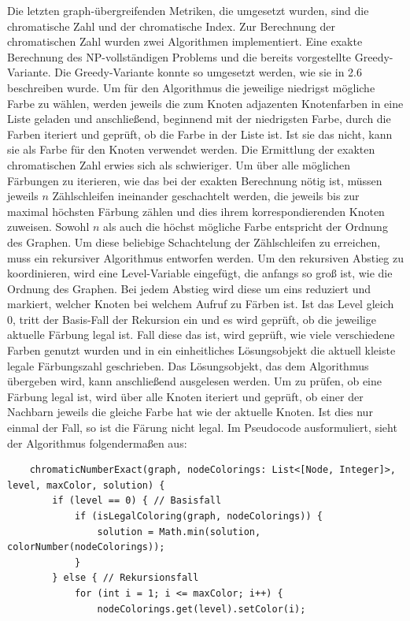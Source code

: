 \documentclass[a4paper,12pt,ngerman,chapterprefix=false,listof=totoc,bibliography=totoc]{scrreprt}
\begin{document}
{{{Die letzten graph-übergreifenden Metriken, die umgesetzt wurden, sind die chromatische Zahl und der chromatische Index. Zur Berechnung der chromatischen Zahl wurden zwei Algorithmen implementiert. Eine exakte Berechnung des NP-vollständigen Problems und die bereits vorgestellte Greedy-Variante. Die Greedy-Variante konnte so umgesetzt werden, wie sie in 2.6 beschreiben wurde. Um für den Algorithmus die jeweilige niedrigst mögliche Farbe zu wählen, werden jeweils die zum Knoten adjazenten Knotenfarben in eine Liste geladen und anschließend, beginnend mit der niedrigsten Farbe, durch die Farben iteriert und geprüft, ob die Farbe in der Liste ist. Ist sie das nicht, kann sie als Farbe für den Knoten verwendet werden. Die Ermittlung der exakten chromatischen Zahl erwies sich als schwieriger. Um über alle möglichen Färbungen zu iterieren, wie das bei der exakten Berechnung nötig ist, müssen jeweils \(n\) Zählschleifen ineinander geschachtelt werden, die jeweils bis zur maximal höchsten Färbung zählen und dies ihrem korrespondierenden Knoten zuweisen. Sowohl \(n\) als auch die höchst mögliche Farbe entspricht der Ordnung des Graphen. Um diese beliebige Schachtelung der Zählschleifen zu erreichen, muss ein rekursiver Algorithmus entworfen werden. Um den rekursiven Abstieg zu koordinieren, wird eine Level-Variable eingefügt, die anfangs so groß ist, wie die Ordnung des Graphen. Bei jedem Abstieg wird diese um eins reduziert und markiert, welcher Knoten bei welchem Aufruf zu Färben ist. Ist das Level gleich 0, tritt der Basis-Fall der Rekursion ein und es wird geprüft, ob die jeweilige aktuelle Färbung legal ist. Fall diese das ist, wird geprüft, wie viele verschiedene Farben genutzt wurden und in ein einheitliches Lösungsobjekt die aktuell kleiste legale Färbungszahl geschrieben. Das Lösungsobjekt, das dem Algorithmus übergeben wird, kann anschließend ausgelesen werden. Um zu prüfen, ob eine Färbung legal ist, wird über alle Knoten iteriert und geprüft, ob einer der Nachbarn jeweils die gleiche Farbe hat wie der aktuelle Knoten. Ist dies nur einmal der Fall, so ist die Färung nicht legal. Im Pseudocode ausformuliert, sieht der Algorithmus folgendermaßen aus:
\begin{lstlisting}
	chromaticNumberExact(graph, nodeColorings: List<[Node, Integer]>, level, maxColor, solution) {
		if (level == 0) { // Basisfall
			if (isLegalColoring(graph, nodeColorings)) {
				solution = Math.min(solution, colorNumber(nodeColorings));
			}
		} else { // Rekursionsfall
			for (int i = 1; i <= maxColor; i++) {
				nodeColorings.get(level).setColor(i);

\end{lstlisting}}}}
\end{document}
